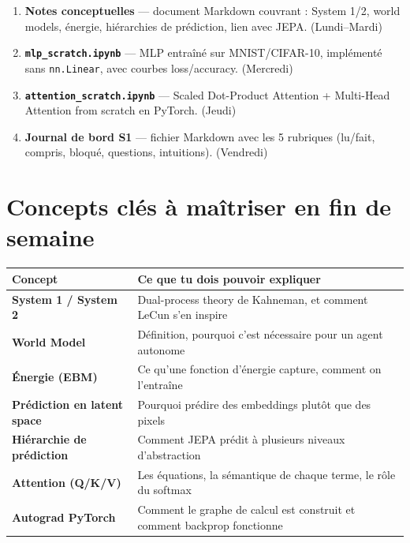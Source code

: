 \documentclass[a4paper,11pt]{article}
\begin{document}
\begin{tcolorbox}[delivbox, title={Ce que tu dois produire d'ici vendredi soir}]
\begin{enumerate}[leftmargin=1cm, itemsep=6pt]
  \item \textbf{Notes conceptuelles} — document Markdown couvrant : System 1/2, world models, énergie, hiérarchies de prédiction, lien avec JEPA. (Lundi–Mardi)
  \item \textbf{\texttt{mlp\_scratch.ipynb}} — MLP entraîné sur MNIST/CIFAR-10, implémenté sans \texttt{nn.Linear}, avec courbes loss/accuracy. (Mercredi)
  \item \textbf{\texttt{attention\_scratch.ipynb}} — Scaled Dot-Product Attention + Multi-Head Attention from scratch en PyTorch. (Jeudi)
  \item \textbf{Journal de bord S1} — fichier Markdown avec les 5 rubriques (lu/fait, compris, bloqué, questions, intuitions). (Vendredi)
\end{enumerate}
\end{tcolorbox}

\vspace{0.8cm}

\section{Concepts clés à maîtriser en fin de semaine}

\renewcommand{\arraystretch}{1.4}
\begin{tabularx}{\textwidth}{>{\bfseries}p{4.5cm} X}
  \toprule
  \rowcolor{jepaBlue!15}
  \textbf{Concept} & \textbf{Ce que tu dois pouvoir expliquer} \\
  \midrule
  System 1 / System 2 & Dual-process theory de Kahneman, et comment LeCun s'en inspire \\
  \rowcolor{rowAlt}
  World Model & Définition, pourquoi c'est nécessaire pour un agent autonome \\
  Énergie (EBM) & Ce qu'une fonction d'énergie capture, comment on l'entraîne \\
  \rowcolor{rowAlt}
  Prédiction en latent space & Pourquoi prédire des embeddings plutôt que des pixels \\
  Hiérarchie de prédiction & Comment JEPA prédit à plusieurs niveaux d'abstraction \\
  \rowcolor{rowAlt}
  Attention (Q/K/V) & Les équations, la sémantique de chaque terme, le rôle du softmax \\
  Autograd PyTorch & Comment le graphe de calcul est construit et comment backprop fonctionne \\
  \bottomrule
\end{tabularx}
\end{document}
